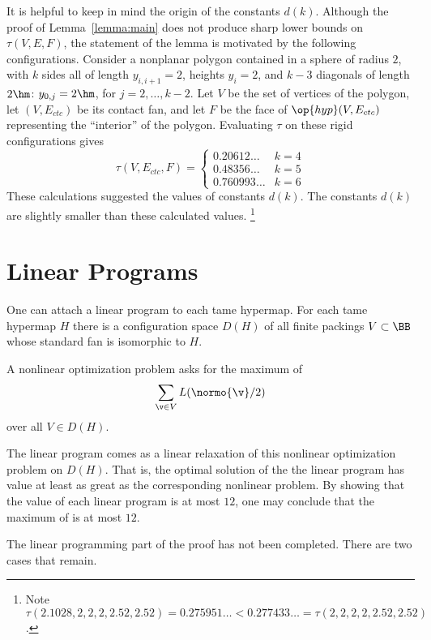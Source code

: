 \begin{remark}
  It is helpful to keep in mind the origin of the constants $d(k)$.
  Although the proof of Lemma~\ref{lemma:main} does not produce sharp
  lower bounds on $\tau(V,E,F)$, the statement of the lemma is
  motivated by the following configurations.  Consider a nonplanar
  polygon contained in a sphere of radius $2$, with $k$ sides all of
  length $y_{i,i+1}=2$, heights $y_i=2$, and $k-3$ diagonals of length
  $2\hm$: $y_{0,j}=2\hm$, for $j=2,\ldots,k-2$.  Let $V$ be the set of
  vertices of the polygon, let $(V,E_{ctc})$ be its contact fan, and
  let $F$ be the face of $\op{hyp}(V,E_{ctc})$ representing the
  ``interior'' of the polygon.  Evaluating $\tau$ on these rigid
  configurations gives
\begin{displaymath}
\tau(V,E_{ctc},F) = 
\begin{cases}
0.20612\ldots & k=4\\
0.48356\ldots & k=5\\
0.760993\ldots &k=6
\end{cases}
\end{displaymath}
These calculations suggested the values of constants $d(k)$.  The
constants $d(k)$ are slightly smaller than these calculated values.%
\footnote{Note $\tau(2.1028,2,2,2,2.52,2.52) = 0.275951\ldots <
  0.277433\ldots = \tau(2,2,2,2,2.52,2.52)$.}  %
%
%
\end{remark}


\section{Linear Programs}

One can attach a linear program to each tame hypermap.
For each tame hypermap $H$ there is a configuration space $D(H)$ of all
finite packings $V\subset \BB$ whose standard fan is
isomorphic to $H$.
%
%

A nonlinear optimization problem asks for the maximum of
\begin{equation}\label{eqn:L2}
\sum_{\v\in V} L(\normo{\v}/2)
\end{equation}
over all $V\in D(H)$.

The linear program comes as a linear relaxation of this nonlinear
optimization problem on $D(H)$. That is, the optimal solution of the
the linear program has value at least as great as the corresponding
nonlinear problem.  By showing that the value of each linear program
is at most $12$, one may conclude that the maximum of 
is at most $12$.


\begin{note}%
  The linear programming part of the proof has not been
  completed. There are two cases that remain.
\end{note}

